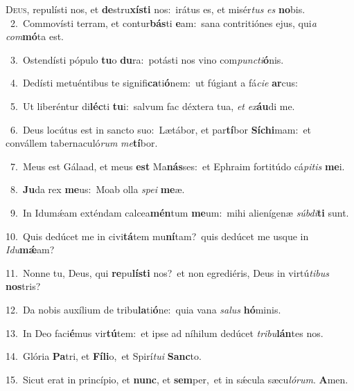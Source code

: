 \lettrine{\initial\textcolor{\initialcolor}{D}}{eus,} repulísti nos, et \textbf{de}\-stru\-\textbf{xís}\-\textbf{ti} nos:~\star irátus es, et misér\textit{tus} \textit{es} \textbf{no}\-bis.\\
{\numbfont\textcolor{\numbcolor}{~2.}}~Commovísti terram, et contur\-\textbf{bás}\-ti \textbf{e}\-am:~\star sana contritiónes ejus, qui\textit{a} \textit{com}\-\textbf{mó}ta est.\par
{\numbfont\textcolor{\numbcolor}{~3.}}~Ostendísti pópulo \textbf{tu}\-o \textbf{du}\-ra:~\star potásti nos vino com\-\textit{punc}\-\textit{ti}\textbf{ó}nis.\par
{\numbfont\textcolor{\numbcolor}{~4.}}~Dedísti metuéntibus te signifi\-\textbf{ca}\-ti\-\textbf{ó}\-nem:~\star ut fúgiant a fá\-\textit{ci}\-\textit{e} \textbf{ar}\-cus:\par
{\numbfont\textcolor{\numbcolor}{~5.}}~Ut liberéntur di\-\textbf{léc}\-ti \textbf{tu}\-i:~\star salvum fac déxtera tua, \textit{et} \textit{ex}\-\textbf{áu}di me.\par
{\numbfont\textcolor{\numbcolor}{~6.}}~Deus locútus est in sancto suo:~\dagger Lætábor, et par\-\textbf{tí}\-bor \textbf{Sí}\-\textbf{chi}mam:~\star et convállem tabernaculó\textit{rum} \textit{me}\-\textbf{tí}bor.\par
{\numbfont\textcolor{\numbcolor}{~7.}}~Meus est Gálaad, et meus \textbf{est} Ma\-\textbf{nás}\-ses:~\star et Ephraim fortitúdo cá\-\textit{pi}\-\textit{tis} \textbf{me}\-i.\par
{\numbfont\textcolor{\numbcolor}{~8.}}~\-\textbf{Ju}\-da rex \textbf{me}\-us:~\star Moab olla \textit{spe}\-\textit{i} \textbf{me}\-æ.\par
{\numbfont\textcolor{\numbcolor}{~9.}}~In Idumǽam exténdam calcea\-\textbf{mén}\-tum \textbf{me}\-um:~\star mihi alienígenæ \textit{súb}\-\textit{di}\textbf{ti} sunt.\par
{\numbfont\textcolor{\numbcolor}{10.}}~Quis dedúcet me in civi\-\textbf{tá}\-tem mu\-\textbf{ní}\-tam?~\star quis dedúcet me usque in \textit{I}\-\textit{du}\textbf{mǽ}am?\par
{\numbfont\textcolor{\numbcolor}{11.}}~Nonne tu, Deus, qui \textbf{re}\-pu\-\textbf{lís}\-\textbf{ti} nos?~\star et non egrediéris, Deus in virtú\-\textit{ti}\-\textit{bus} \textbf{nos}\-tris?\par
{\numbfont\textcolor{\numbcolor}{12.}}~Da nobis auxílium de tribu\-\textbf{la}\-ti\-\textbf{ó}\-ne:~\star quia vana \textit{sa}\-\textit{lus} \textbf{hó}\-minis.\par
{\numbfont\textcolor{\numbcolor}{13.}}~In Deo faci\-\textbf{é}\-mus vir\-\textbf{tú}\-tem:~\star et ipse ad níhilum dedúcet \textit{tri}\-\textit{bu}\textbf{lán}tes nos.\par
{\numbfont\textcolor{\numbcolor}{14.}}~Glória \textbf{Pa}\-tri, et \textbf{Fí}\-\textbf{li}o,~\star et Spirí\-\textit{tu}\-\textit{i} \textbf{Sanc}\-to.\par
{\numbfont\textcolor{\numbcolor}{15.}}~Sicut erat in princípio, et \textbf{nunc}\-, et \textbf{sem}\-per,~\star et in sǽcula sæcu\-\textit{ló}\-\textit{rum}. \textbf{A}\-men.\par
